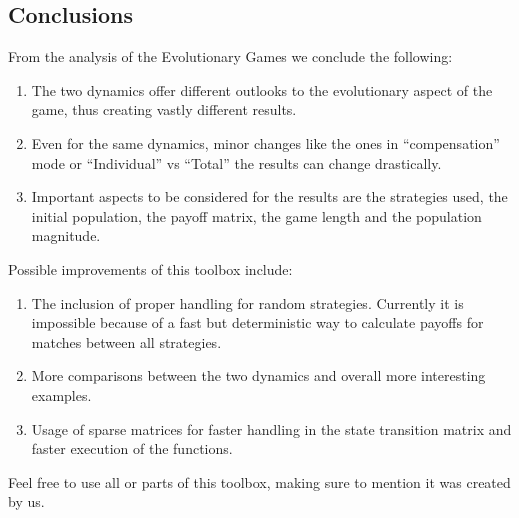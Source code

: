 \subsection{Conclusions}
From the analysis of the Evolutionary Games we conclude the following:
\begin{enumerate}
\item The two dynamics offer different outlooks to the evolutionary aspect of the game, thus creating vastly different results.

\item Even for the same dynamics, minor changes like the ones in ``compensation'' mode or ``Individual'' vs ``Total'' the results can change drastically.

\item Important aspects to be considered for the results are the strategies used, the initial population, the payoff matrix, the game length and the population magnitude.
\end{enumerate}

Possible improvements of this toolbox include:

\begin{enumerate}
\item The inclusion of proper handling for random strategies. Currently it is impossible because of a fast but deterministic way to calculate payoffs for matches between all strategies.

\item More comparisons between the two dynamics and overall more interesting examples.

\item Usage of sparse matrices for faster handling in the state transition matrix and faster execution of the functions.
\end{enumerate}

Feel free to use all or parts of this toolbox, making sure to mention it was created by us.